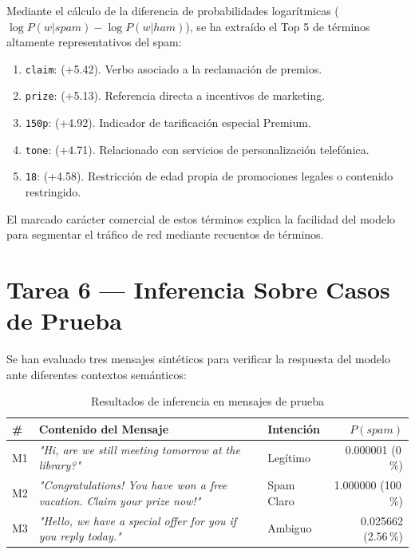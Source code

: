 \documentclass[../../__memoria.tex]{subfiles}
\begin{document}
Mediante el cálculo de la diferencia de probabilidades logarítmicas ($\log P(w | spam) - \log P(w | ham)$), se ha extraído el Top 5 de términos altamente representativos del spam:

\begin{enumerate}
    \item \texttt{claim}: (+5.42). Verbo asociado a la reclamación de premios.
    \item \texttt{prize}: (+5.13). Referencia directa a incentivos de marketing.
    \item \texttt{150p}: (+4.92). Indicador de tarificación especial Premium.
    \item \texttt{tone}: (+4.71). Relacionado con servicios de personalización telefónica.
    \item \texttt{18}: (+4.58). Restricción de edad propia de promociones legales o contenido restringido.
\end{enumerate}

El marcado carácter comercial de estos términos explica la facilidad del modelo para segmentar el tráfico de red mediante recuentos de términos.

\section[Tarea 6: Inferencia]{Tarea 6 --- Inferencia Sobre Casos de Prueba}

Se han evaluado tres mensajes sintéticos para verificar la respuesta del modelo ante diferentes contextos semánticos:

\begin{table}[H]
  \centering
  \caption{Resultados de inferencia en mensajes de prueba}
  \label{tab:t6_mensajes}
  \begin{tabular}{@{}lp{5.5cm}p{2.8cm}r@{}}
    \toprule
    \# & \textbf{Contenido del Mensaje} & \textbf{Intención} & \textbf{$P(spam)$} \\
    \midrule
    M1 & \textit{"Hi, are we still meeting tomorrow at the library?"} & Legítimo & 0.000001 (0\,\%) \\
    M2 & \textit{"Congratulations! You have won a free vacation. Claim your prize now!"} & Spam Claro & 1.000000 (100\,\%) \\
    M3 & \textit{"Hello, we have a special offer for you if you reply today."} & Ambiguo & 0.025662 (2.56\,\%) \\
    \bottomrule
  \end{tabular}
\end{table}
\end{document}
